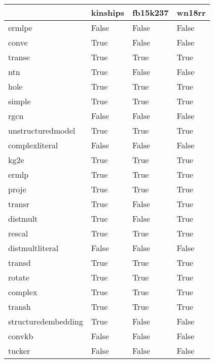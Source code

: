 \begin{tabular}{llll}
\toprule
{} &  kinships &  fb15k237 &  wn18rr \\
\midrule
ermlpe              &     False &     False &   False \\
conve               &      True &     False &   False \\
transe              &      True &      True &    True \\
ntn                 &      True &     False &   False \\
hole                &      True &      True &    True \\
simple              &      True &      True &    True \\
rgcn                &     False &     False &   False \\
unstructuredmodel   &      True &      True &    True \\
complexliteral      &     False &     False &   False \\
kg2e                &      True &      True &    True \\
ermlp               &      True &      True &    True \\
proje               &      True &      True &    True \\
transr              &      True &     False &    True \\
distmult            &      True &     False &    True \\
rescal              &      True &      True &    True \\
distmultliteral     &     False &     False &   False \\
transd              &      True &      True &    True \\
rotate              &      True &      True &    True \\
complex             &      True &      True &    True \\
transh              &      True &      True &    True \\
structuredembedding &      True &     False &   False \\
convkb              &     False &     False &   False \\
tucker              &     False &     False &   False \\
\bottomrule
\end{tabular}
